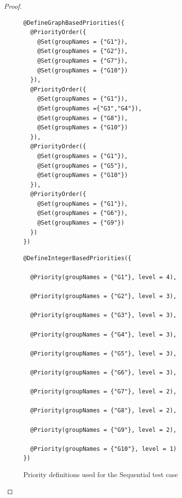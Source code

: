 \documentclass[11pt]{report}
\begin{document}
\begin{proof}
\begin{figure}[!ht]
	\lstset{language=java, numbers=left, numberstyle=\tiny, stepnumber=1, numbersep=5pt, basicstyle=\footnotesize}
	\begin{minipage}{0.41\textwidth}
	\begin{lstlisting}[frame=single]
@DefineGraphBasedPriorities({
  @PriorityOrder({
    @Set(groupNames = {"G1"}),
    @Set(groupNames = {"G2"}),
    @Set(groupNames = {"G7"}),
    @Set(groupNames = {"G10"})
  }),
  @PriorityOrder({
    @Set(groupNames = {"G1"}),
    @Set(groupNames ={"G3","G4"}),
    @Set(groupNames = {"G8"}),
    @Set(groupNames = {"G10"})
  }),
  @PriorityOrder({
    @Set(groupNames = {"G1"}),
    @Set(groupNames = {"G5"}),
    @Set(groupNames = {"G10"})
  }),
  @PriorityOrder({
    @Set(groupNames = {"G1"}),
    @Set(groupNames = {"G6"}),
    @Set(groupNames = {"G9"})
  })
})
 	\end{lstlisting}
 	\end{minipage}
 	\hfill
	\begin{minipage}{0.55\textwidth}
	\begin{lstlisting}[frame=single]
@DefineIntegerBasedPriorities({

  @Priority(groupNames = {"G1"}, level = 4),
  
  @Priority(groupNames = {"G2"}, level = 3),
  
  @Priority(groupNames = {"G3"}, level = 3),
  
  @Priority(groupNames = {"G4"}, level = 3),
  
  @Priority(groupNames = {"G5"}, level = 3),
  
  @Priority(groupNames = {"G6"}, level = 3),
  
  @Priority(groupNames = {"G7"}, level = 2),
  
  @Priority(groupNames = {"G8"}, level = 2),
  
  @Priority(groupNames = {"G9"}, level = 2),
  
  @Priority(groupNames = {"G10"}, level = 1)
})
 	\end{lstlisting}
 	\end{minipage}	
	\caption{Priority definitions used for the Sequential test case}
	\label{fig:sequential-decl}
\end{figure}


\end{proof}
\end{document}
